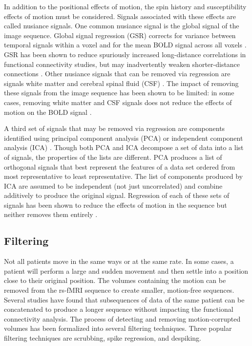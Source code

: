 In addition to the positional effects of motion, the spin history and susceptibility effects of motion must be considered. Signals associated with these effects are called nusiance signals. One common nusiance signal is the global signal of the image sequence. Global signal regression (GSR) corrects for variance between temporal signals within a voxel and for the mean BOLD signal across all voxels \cite{Power2014} \cite{Satterthwaite2013} \cite{Yan2013} \cite{Yan2013a}. GSR has been shown to reduce spuriously increased long-distance correlations in functional connectivity studies, but may inadvertently weaken shorter-distance connections \cite{Jo2013} \cite{Power2014}  \cite{Satterthwaite2012}. Other nusiance signals that can be removed via regression are signals white matter and cerebral spinal fluid (CSF) \cite{Power2014} \cite{Satterthwaite2013}. The impact of removing these signals from the image sequence has been shown to be limited: in some cases, removing white matter and CSF signals does not reduce the effects of motion on the BOLD signal \cite{Yan2013a} \cite{Jo2010}.

A third set of signals that may be removed via regression are components identified using principal component analysis (PCA) or independent component analysis (ICA) \cite{Pruim2015} \cite{Salimi-Khorshidi2014} \cite{Behzadi2007}. Though both PCA and ICA decompose a set of data into a list of signals, the properties of the lists are different. PCA produces a list of orthogonal signals that best represent the features of a data set ordered from most representative to least representative. The list of components produced by ICA are assumed to be independent (not just uncorrelated) and combine additively to produce the original signal. Regression of each of these sets of signals has been shown to reduce the effects of motion in the sequence but neither removes them entirely \cite{Power2015} \cite{Parkes2017}. 

\subsection{Filtering}

Not all patients move in the same ways or at the same rate. In some cases, a patient will perform a large and sudden movement and then settle into a position close to their original position. The volumes containing the motion can be removed from the rs-fMRI sequence to create smaller, motion-free sequences. Several studies have found that subsequences of data of the same patient can be concatenated to produce a longer sequence without impacting the functional connectivity analysis. The process of detecting and removing motion-corrupted volumes has been formalized into several filtering techniques. 
Three popular filtering techniques are scrubbing, spike regression, and despiking. 

